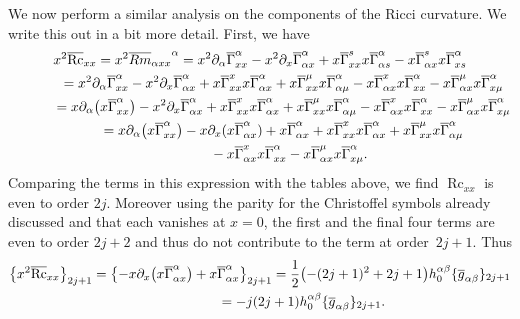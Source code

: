 \documentclass[11pt]{article}
\numberwithin{equation}{section}
\newcommand{\olg}{\overline{g}}
\newcommand{\olGamma}{\overline{\Gamma}}
\DeclareMathOperator{\Rc}{Rc}
\begin{document}
We now perform a similar analysis on the components of the Ricci curvature. We write this out in a bit more detail. First, we have
\begin{gather*}
x^2 \overline{\Rc}_{xx} = x^2 {\overline{Rm}_{\alpha x x}}^{\alpha} = x^2 \partial_{\alpha} \olGamma_{xx}^{\alpha} - x^2 \partial_{x} \olGamma_{\alpha x}^{\alpha} + x\olGamma_{xx}^{s} x \olGamma_{\alpha s}^{\alpha} - x \olGamma_{\alpha x}^{s} x \olGamma_{x s}^{\alpha} \nonumber\\
\hphantom{x^2 \overline{\Rc}_{xx}}{} = x^2 \partial_{\alpha} \olGamma_{xx}^{\alpha} - x^2 \partial_{x} \olGamma_{\alpha x}^{\alpha} + x\olGamma_{xx}^{x} x\olGamma_{\alpha x}^{\alpha} + x\olGamma_{xx}^{\mu} x\olGamma_{\alpha \mu}^{\alpha} - x\olGamma_{\alpha x}^{x} x\olGamma_{x x}^{\alpha} - x\olGamma_{\alpha x}^{\mu} x\olGamma_{x \mu}^{\alpha}\nonumber\\
\hphantom{x^2 \overline{\Rc}_{xx}}{} = x \partial_{\alpha} \big(x \olGamma_{xx}^{\alpha}\big) - x^2 \partial_{x} \olGamma_{\alpha x}^{\alpha} + x\olGamma_{xx}^{x} x\olGamma_{\alpha x}^{\alpha} + x\olGamma_{xx}^{\mu} x\olGamma_{\alpha \mu}^{\alpha} - x\olGamma_{\alpha x}^{x} x\olGamma_{x x}^{\alpha}
 - x\olGamma_{\alpha x}^{\mu} x\olGamma_{x \mu}^{\alpha}\nonumber\\
\hphantom{x^2 \overline{\Rc}_{xx}}{} = x \partial_{\alpha} \big(x \olGamma_{xx}^{\alpha}\big) - x \partial_{x} (x \olGamma_{\alpha x}^{\alpha} ) + x \olGamma_{\alpha x}^{\alpha} + x\olGamma_{xx}^{x} x\olGamma_{\alpha x}^{\alpha} + x\olGamma_{xx}^{\mu} x\olGamma_{\alpha \mu}^{\alpha}\nonumber\\
\hphantom{x^2 \overline{\Rc}_{xx}=}{} - x\olGamma_{\alpha x}^{x} x\olGamma_{x x}^{\alpha} - x\olGamma_{\alpha x}^{\mu} x\olGamma_{x \mu}^{\alpha}.%
\end{gather*}
Comparing the terms in this expression with the tables above, we find $\Rc_{xx}$ is even to order $2j$. Moreover using the parity for the Christoffel symbols already discussed and that each vanishes at $x=0$, the first and the final four terms are even to order $2j+2$ and thus do not contribute to the term at order~$2j+1$. Thus
\begin{gather}
\big\{ x^2 \overline{\Rc}_{xx} \big\}_{2j+1} = \big\{{-} x \partial_{x} \big(x \olGamma_{\alpha x}^{\alpha}\big) + x \olGamma_{\alpha x}^{\alpha} \big\}_{2j+1}
= \frac{1}{2} \big( {-}(2j+1)^2 + 2j+1 \big) h_0^{\alpha \beta} \{ \olg_{\alpha \beta} \}_{2j+1} \nonumber\\
\hphantom{\big\{ x^2 \overline{\Rc}_{xx} \big\}_{2j+1}}{} = -j (2j+1) h_0^{\alpha \beta} \{ \olg_{\alpha \beta} \}_{2j+1}.\label{eqA.5}
\end{gather}
\end{document}
